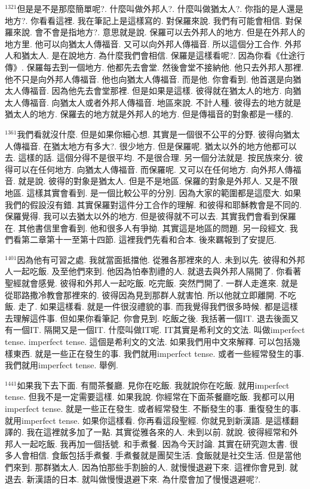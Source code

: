 \documentclass{book}
\begin{document}
$^{1321}$但是是不是那麼簡單呢?.
什麼叫做外邦人?.
什麼叫做猶太人?.
你指的是人還是地方?.
你看看這裡.
我在筆記上是這樣寫的.
對保羅來說.
我們有可能會相信.
對保羅來說.
會不會是指地方?.
意思就是說.
保羅可以去外邦人的地方.
但是在外邦人的地方里.
他可以向猶太人傳福音.
又可以向外邦人傳福音.
所以這個分工合作.
外邦人和猶太人.
是在說地方.
為什麼我們會相信.
保羅是這樣看呢?.
因為你看《仕途行傳》.
保羅每去到一個地方.
他都先去會堂.
然後會堂不接納他.
他只去外邦人那裡.
他不只是向外邦人傳福音.
他也向猶太人傳福音.
而是他.
你會看到.
他首選是向猶太人傳福音.
因為他先去會堂那裡.
但是如果是這樣.
彼得就在猶太人的地方.
向猶太人傳福音.
向猶太人或者外邦人傳福音.
地區來說.
不計人種.
彼得去的地方就是猶太人的地方.
保羅去的地方就是外邦人的地方.
但是傳福音的對象都是一樣的.

$^{1361}$我們看就沒什麼.
但是如果你細心想.
其實是一個很不公平的分野.
彼得向猶太人傳福音.
在猶太地方有多大?.
很少地方.
但是保羅呢.
猶太以外的地方他都可以去.
這樣的話.
這個分得不是很平均.
不是很合理.
另一個分法就是.
按民族來分.
彼得可以在任何地方.
向猶太人傳福音.
而保羅呢.
又可以在任何地方.
向外邦人傳福音.
就是說.
彼得的對象是猶太人.
但是不是地區.
保羅的對象是外邦人.
又是不限地區.
這樣其實會看到.
是一個比較公平的分別.
因為大家的範圍都是這麼大.
如果我們的假設沒有錯.
其實保羅對這件分工合作的理解.
和彼得和耶穌教會是不同的.
保羅覺得.
我可以去猶太以外的地方.
但是彼得就不可以去.
其實我們會看到保羅在.
其他書信里會看到.
他和很多人有爭拗.
其實這是地區的問題.
另一段經文.
我們看第二章第十一至第十四節.
這裡我們先看和合本.
後來羈報到了安提厄.

$^{1401}$因為他有可習之處.
我就當面抵擋他.
從雅各那裡來的人.
未到以先.
彼得和外邦人一起吃飯.
及至他們來到.
他因為怕奉割禮的人.
就退去與外邦人隔開了.
你看著聖經就會感覺.
彼得和外邦人一起吃飯.
吃完飯.
突然門開了.
一群人走進來.
就是從耶路撒冷教會那裡來的.
彼得因為見到那群人就害怕.
所以他就立即離開.
不吃飯.
走了.
如果這樣看.
就是一件很沒禮貌的事.
而我覺得我們很多時候.
都是這樣去理解這件事.
但如果你看筆記.
你會見到.
吃飯之後.
我括著一個IT.
退去後面又有一個IT.
隔開又是一個IT.
什麼叫做IT呢.
IT其實是希利文的文法.
叫做imperfect tense.
imperfect tense.
這個是希利文的文法.
如果我們用中文來解釋.
可以包括幾樣東西.
就是一些正在發生的事.
我們就用imperfect tense.
或者一些經常發生的事.
我們就用imperfect tense.
舉例.

$^{1441}$如果我下去下面.
有間茶餐廳.
見你在吃飯.
我就說你在吃飯.
就用imperfect tense.
但我不是一定需要這樣.
如果我說.
你經常在下面茶餐廳吃飯.
我都可以用imperfect tense.
就是一些正在發生.
或者經常發生.
不斷發生的事.
重復發生的事.
就用imperfect tense.
如果你這樣看.
你再看這段聖經.
你就見到新漢語.
是這樣翻譯的.
我在這裡就多加了一點.
其實從雅各來的人.
未到以前.
就說.
彼得經常和外邦人一起吃飯.
我再加一個括號.
和手煮餐.
因為今天討論.
其實在研究迦太書.
很多人會相信.
食飯包括手煮餐.
手煮餐就是團契生活.
食飯就是社交生活.
但是當他們來到.
那群猶太人.
因為怕那些手割臉的人.
就慢慢退避下來.
這裡你會見到.
就退去.
新漢語的日本.
就叫做慢慢退避下來.
為什麼會加了慢慢退避呢?.
\end{document}
